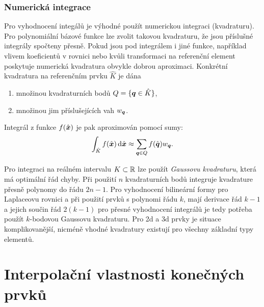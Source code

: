 \subsubsection{Numerická integrace}
Pro vyhodnocení integálů je výhodné použít numerickou integraci (kvadraturu). Pro polynomiální bázové funkce lze zvolit takovou kvadraturu, že jsou 
příslušné integrály spočteny přesně. Pokud jsou pod integrálem i jiné funkce, například vlivem koeficientů v rovnici nebo kvůli 
transformaci na referenční element poskytuje numerická kvadratura obvykle dobrou aproximaci. Konkrétní kvadratura na referenčním prvku $\hat K$ je dána
\begin{enumerate}
 \item množinou kvadraturních bodů $Q=\{\mathbf{\boldsymbol{q}} \in \hat K\}$,
 \item množinou jim příslušejících vah $w_{\mathbf{\boldsymbol{q}}}$.
\end{enumerate}
Integrál z funkce $f(\hat{\mathbf{\boldsymbol{x}}})$ je pak aproximován pomocí sumy:
\[
    \int_{\hat K} f(\hat{\mathbf{\boldsymbol{x}}}) \,{\rm d} \hat{\mathbf{\boldsymbol{x}}} \approx \sum_{\mathbf{\boldsymbol{q}}\in Q} f(\hat{\mathbf{\boldsymbol{q}}}) w_{\mathbf{\boldsymbol{q}}}.
\]

Pro integraci na reálném intervalu $K\subset {\mathbb R}$ lze použít {\it Gaussovu kvadraturu},  která má optimální řád chyby. Při použití $n$ kvadraturních bodů integruje
kvadrature přesně polynomy do řádu $2n-1$. Pro vyhodnocení bilineární formy pro Laplaceovu rovnici a při použití prvků s polynomi řádu $k$, mají derivace řád $k-1$ a 
jejich součin řád $2(k-1)$ pro přesné vyhodnocení integrálů je tedy potřeba použít $k$-bodovou Gaussovu kvadraturu. Pro 2d a 3d prvky je situace komplikovanější,
nicméně vhodné kvadratury existují pro všechny základní typy elementů.

\section{Interpolační vlastnosti konečných prvků}
% 






